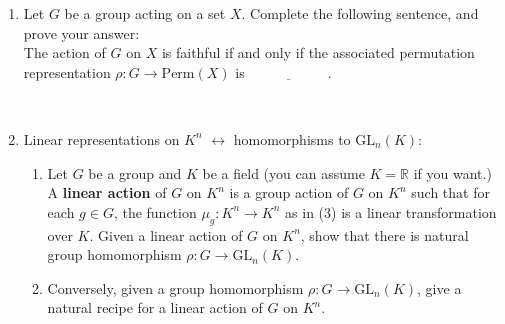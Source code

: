 \documentclass[12pt]{amsart}
\newcommand\itemB{\stepcounter{enumi}\item[(\theenumi)]}
\begin{document}
\begin{enumerate}
\newpage

\itemB Let $G$ be a group acting on a set $X$. Complete the following sentence, and prove your answer: \\
The action of $G$ on $X$ is faithful if and only if the associated permutation representation ${\rho: G\to \mathrm{Perm}(X)}$ is $\underline{\phantom{INJECTIVE}}$.

\

\itemB Linear representations on $K^n$ $\longleftrightarrow$ homomorphisms to $\mathrm{GL}_n(K)$:
\begin{enumerate}
\item Let $G$ be a group and $K$ be a field (you can assume $K=\mathbb{R}$ if you want.) A \textbf{linear action} of $G$ on $K^n$ is a group action of $G$ on $K^n$ such that for each $g\in G$, the function $\mu_g: K^n \to K^n$ as in (3) is a linear transformation over $K$. Given a linear action of $G$ on $K^n$, show that there is natural group homomorphism $\rho: G\to \mathrm{GL}_n(K)$. 
\item Conversely, given a group homomorphism $\rho: G \to \mathrm{GL}_n(K)$, give a natural recipe for a linear action of $G$ on $K^n$.
\end{enumerate}
\end{enumerate}
\end{document}
